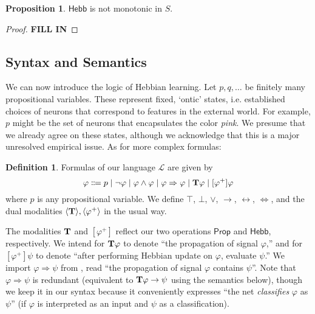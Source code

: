 \documentclass[letterpaper]{article}
\theoremstyle{definition}
\newtheorem{definition}{Definition}
\newtheorem{proposition}{Proposition}
\newcommand{\lang}{\mathcal{L}}
\newcommand{\Typ}{\textrm{\textup{\textbf{T}}}}
\newcommand{\Prop}{\textsf{Prop}}
\newcommand{\Inc}{\textsf{Hebb}}
\begin{document}
\begin{proposition}
$\Inc$ is not monotonic in $S$.
\end{proposition}  
\begin{proof}
\textbf{\textcolor{myred}{FILL IN}}
\end{proof}

\subsection{Syntax and Semantics}

We can now introduce the logic of Hebbian learning.  Let $p, q, \ldots$ be finitely many propositional variables.  These represent fixed, `ontic' states, i.e. established choices of neurons that correspond to features in the external world.  For example, $p$ might be the set of neurons that encapsulates the color \emph{pink}.  We presume that we already agree on these states, although we acknowledge that this is a major unresolved empirical issue.  As for more complex formulas:

\begin{definition}  Formulas of our language $\lang$ are given by
\[
\varphi \Coloneqq p \mid \neg \varphi \mid \varphi \land \varphi \mid \varphi \Rightarrow \varphi \mid \Typ \varphi \mid [\varphi^+] \varphi
\]
where $p$ is any propositional variable.  We define $\top$, $\bot$, $\lor$, $\to$, $\leftrightarrow$, $\Leftrightarrow$, and the dual modalities $\langle \Typ \rangle, \langle \varphi^+ \rangle$ in the usual way.
\end{definition}

The modalities $\Typ$ and $[\varphi^+]$ reflect our two operations $\Prop$ and $\Inc$, respectively.  We intend for $\Typ \varphi$ to denote ``the propagation of signal $\varphi$,'' and for $[\varphi^+] \psi$ to denote ``after performing Hebbian update on $\varphi$, evaluate $\psi$.''  We import ${\varphi \Rightarrow \psi}$ from \citep{leitgeb2001nonmonotonic}, read ``the propagation of signal $\varphi$ contains $\psi$''.  Note that ${\varphi \Rightarrow \psi}$ is redundant (equivalent to $\Typ \varphi \to \psi$ using the semantics below), though we keep it in our syntax because it conveniently expresses ``the net \emph{classifies} $\varphi$ as $\psi$'' (if $\varphi$ is interpreted as an input and $\psi$ as a classification).
\end{document}
